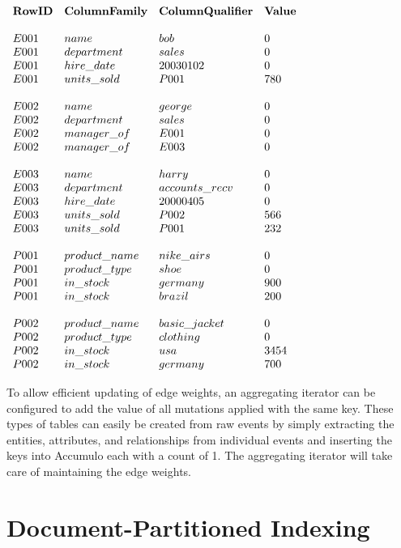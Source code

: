 $\begin{array}{llll}
\bf{RowID} & \bf{Column Family} & \bf{Column Qualifier} & \bf{Value} \\
\\
E001 & name & bob & 0 \\
E001 & department & sales & 0 \\
E001 & hire\_date & 20030102 & 0 \\
E001 & units\_sold & P001 & 780 \\
\\
E002 & name & george & 0 \\
E002 & department & sales & 0 \\
E002 & manager\_of & E001 & 0 \\
E002 & manager\_of & E003 & 0 \\
\\
E003 & name & harry & 0 \\
E003 & department & accounts\_recv & 0 \\
E003 & hire\_date & 20000405 & 0 \\
E003 & units\_sold & P002 & 566 \\
E003 & units\_sold & P001 & 232 \\
\\
P001 & product\_name & nike\_airs & 0 \\
P001 & product\_type & shoe & 0 \\
P001 & in\_stock & germany & 900 \\
P001 & in\_stock & brazil & 200 \\
\\
P002 & product\_name & basic\_jacket & 0 \\
P002 & product\_type & clothing & 0 \\
P002 & in\_stock & usa & 3454 \\
P002 & in\_stock & germany & 700 \\
\end{array}$
\vspace{5mm}

To allow efficient updating of edge weights, an aggregating iterator can be
configured to add the value of all mutations applied with the same key. These types
of tables can easily be created from raw events by simply extracting the entities,
attributes, and relationships from individual events and inserting the keys into
Accumulo each with a count of 1. The aggregating iterator will take care of
maintaining the edge weights.

\section{Document-Partitioned Indexing}

